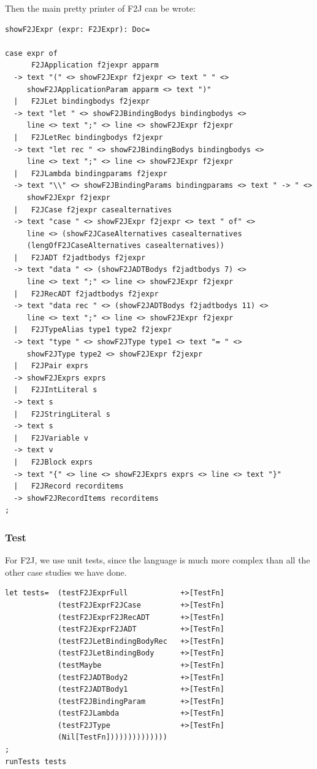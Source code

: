 Then the main pretty printer of F2J can be wrote:
\begin{lstlisting}
showF2JExpr (expr: F2JExpr): Doc=

case expr of
      F2JApplication f2jexpr apparm
  -> text "(" <> showF2JExpr f2jexpr <> text " " <>
     showF2JApplicationParam apparm <> text ")"
  |   F2JLet bindingbodys f2jexpr
  -> text "let " <> showF2JBindingBodys bindingbodys <>
     line <> text ";" <> line <> showF2JExpr f2jexpr
  |   F2JLetRec bindingbodys f2jexpr
  -> text "let rec " <> showF2JBindingBodys bindingbodys <>
     line <> text ";" <> line <> showF2JExpr f2jexpr
  |   F2JLambda bindingparams f2jexpr
  -> text "\\" <> showF2JBindingParams bindingparams <> text " -> " <>
     showF2JExpr f2jexpr
  |   F2JCase f2jexpr casealternatives
  -> text "case " <> showF2JExpr f2jexpr <> text " of" <>
     line <> (showF2JCaseAlternatives casealternatives
     (lengOfF2JCaseAlternatives casealternatives))
  |   F2JADT f2jadtbodys f2jexpr
  -> text "data " <> (showF2JADTBodys f2jadtbodys 7) <>
     line <> text ";" <> line <> showF2JExpr f2jexpr
  |   F2JRecADT f2jadtbodys f2jexpr
  -> text "data rec " <> (showF2JADTBodys f2jadtbodys 11) <>
     line <> text ";" <> line <> showF2JExpr f2jexpr
  |   F2JTypeAlias type1 type2 f2jexpr
  -> text "type " <> showF2JType type1 <> text "= " <>
     showF2JType type2 <> showF2JExpr f2jexpr
  |   F2JPair exprs
  -> showF2JExprs exprs
  |   F2JIntLiteral s
  -> text s
  |   F2JStringLiteral s
  -> text s
  |   F2JVariable v
  -> text v
  |   F2JBlock exprs
  -> text "{" <> line <> showF2JExprs exprs <> line <> text "}"
  |   F2JRecord recorditems
  -> showF2JRecordItems recorditems
;
\end{lstlisting}

\subsubsection{Test}

For F2J, we use unit tests, since the language is much more complex than all the other case studies we have done.

\begin{lstlisting}
let tests=  (testF2JExprFull            +>[TestFn]
            (testF2JExprF2JCase         +>[TestFn]
            (testF2JExprF2JRecADT       +>[TestFn]
            (testF2JExprF2JADT          +>[TestFn]
            (testF2JLetBindingBodyRec   +>[TestFn]
            (testF2JLetBindingBody      +>[TestFn]
            (testMaybe                  +>[TestFn]
            (testF2JADTBody2            +>[TestFn]
            (testF2JADTBody1            +>[TestFn]
            (testF2JBindingParam        +>[TestFn]
            (testF2JLambda              +>[TestFn]
            (testF2JType                +>[TestFn]
            (Nil[TestFn])))))))))))))
;
runTests tests
\end{lstlisting}

